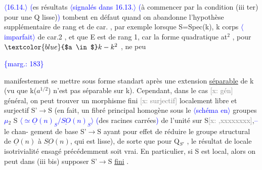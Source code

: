 \documentclass[11pt]{article}
\newcommand{\scanpage}[1]{\par\bigskip\noindent{\small\sffamily[scan #1]}\par}
\newcommand{\mspage}[1]{{\small\sffamily[p.\,#1]}}
\newcommand{\hand}[1]{\textcolor{blue}{#1}}
\let\over\relax
\newcommand{\over}[2]{\textcolor{gray}{#1}\textcolor{blue}{\ensuremath{^{\!\nearrow}}#2}}
\newcommand{\inserted}[2][]{\textcolor{blue}{$\langle$#2$\rangle$}}
\newcommand{\margin}[1]{\textcolor{blue}{\{\textsf{marg.:} #1\}}}
\newcommand{\xout}[1]{\textcolor{gray}{[\textsf{x:} #1]}}
\newcommand{\uline}[1]{\underline{#1}}
\begin{document}
\inserted{16.14.} \hand{(}\over{L}{C}es résultats \inserted{signalés dans 16.13.} \hand{(}à commencer par la condition (iii ter) pour une Q
lisse)\hand{)} tombent en défaut quand on abandonne l'hypothèse supplémentaire
de rang et de car. , par exemple lorsque S=Spec(k), k corps \inserted{imparfait} de car.2 , et
que E est de rang 1, car la forme quadratique at$^{2}$ , pour $\hand{$a \in$} k - k^{2}$ , ne peu

\margin{183}

\clearpage
\scanpage{25/184}
\mspage{11}

manifestement se mettre sous forme standart après une extension \uline{séparable}
de k (vu que k($a^{1/2}$) n'est pas séparable sur k). Cependant, dans le cas
\xout{gén} général, on peut trouver un morphisme fini \xout{surjectif} localement
libre et surjectif S'$\to$S (en fait, un fibré principal homogène sous
le \inserted{schéma en} groupes \hand{$\mu$}$_{2}$ S \inserted{$\simeq \underline{O}(n)_S/\underline{SO}(n)_S$} \hand{(}des racines carrées\hand{)} de l'unité sur S\xout{,xxxxxxxx},\hand{--} le chan-%
gement de base S'$\to$S ayant pour effet de réduire le groupe structural de
$\underline{O}(n)$ à $\underline{SO}(n)$, qui est lisse), de sorte que pour Q$_{S'}$ , le résultat de
locale isotrivialité en\over{v}{vi}sagé précédemment soit vrai. En particulier, si
S est local, alors on peut dans (iii bis) supposer S'$\to$S \uline{fini} .

\mspage{184}
\end{document}
